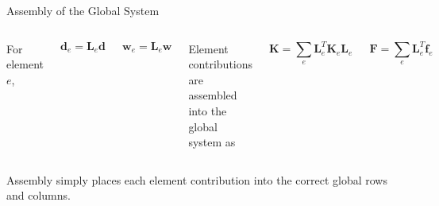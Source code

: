 \documentclass[aspectratio=169]{beamer}
\begin{document}
\begin{frame}{Assembly of the Global System}

\begin{columns}[T,onlytextwidth]


\centering
\resizebox{\textwidth}{!}{%

}


\small

For element \(e\),

\[
\mathbf{d}_e = \mathbf{L}_e \mathbf{d}
\]

\[
\mathbf{w}_e = \mathbf{L}_e \mathbf{w}
\]

\bigskip

Element contributions are assembled into the global system as

\[
\mathbf{K}
=
\sum_e
\mathbf{L}_e^{T}\mathbf{K}_e\mathbf{L}_e
\]

\[
\mathbf{F}
=
\sum_e
\mathbf{L}_e^{T}\mathbf{f}_e
\]

\end{columns}

\vspace{1mm}
\centering
\footnotesize
Assembly simply places each element contribution into the correct global rows and columns.

\end{frame}






\end{document}
